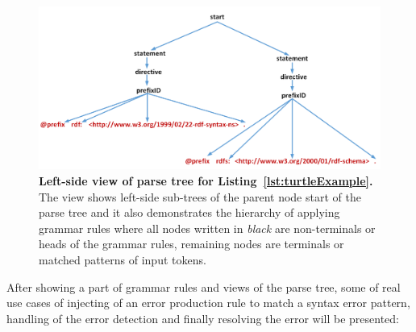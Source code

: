 \begin{figure}
		\centering\includegraphics[width=1\linewidth]{images/implementationParseTreeLeft.png}
		\caption{\textbf{Left-side view of parse tree for Listing~\ref{lst:turtleExample}.} The view shows left-side sub-trees of the parent node start of the parse tree and it also demonstrates the hierarchy of applying grammar rules where all nodes written in \emph{black} are non-terminals or heads of the grammar rules, remaining nodes are terminals or matched patterns of input tokens.}
	\label{Fig:implementationParseTreeLeft}
\end{figure}



After showing a part of grammar rules and views of the parse tree, some of real use cases of injecting of an error production rule to match a syntax error pattern,  handling of the error detection and finally resolving the error  will be presented:

